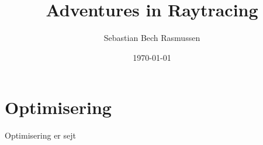 \documentclass{article}
\title{Adventures in Raytracing}
\author{Sebastian Bech Rasmussen}
\date{\today}
\begin{document}
\begin{titlepage}
    \maketitle
\end{titlepage}

\section{Optimisering}

Optimisering er sejt
\end{document}
